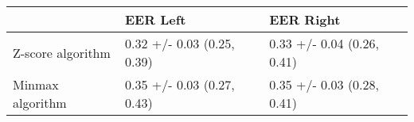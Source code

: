 \begin{tabular}{lll}
\toprule
{} &                    EER Left &                   EER Right \\
\midrule
Z-score algorithm &  0.32 +/- 0.03 (0.25, 0.39) &  0.33 +/- 0.04 (0.26, 0.41) \\
Minmax algorithm  &  0.35 +/- 0.03 (0.27, 0.43) &  0.35 +/- 0.03 (0.28, 0.41) \\
\bottomrule
\end{tabular}
